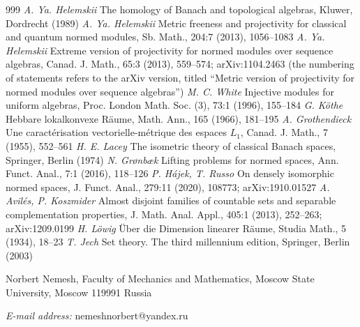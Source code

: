 \documentclass[12pt]{article}
\begin{document}
\begin{thebibliography}{999}
    \textit{A. Ya. Helemskii} The homology of Banach and topological algebras,
    Kluwer, Dordrecht (1989)
    \textit{A. Ya. Helemskii} Metric freeness and projectivity for classical
    and quantum normed modules, Sb. Math., 204:7 (2013), 1056--1083
    \textit{A. Ya. Helemskii} Extreme version of projectivity for normed
    modules over sequence algebras, Canad. J. Math., 65:3 (2013), 559--574;
    arXiv:1104.2463 (the numbering of statements refers to the arXiv
    version, titled ``Metric version of projectivity for normed modules over
    sequence algebras'')
    \textit{M. C. White} Injective modules for uniform algebras, Proc. London
    Math. Soc. (3), 73:1 (1996), 155--184
    \textit{G. K\"othe} Hebbare lokalkonvexe R\"aume, Math. Ann., 165 (1966),
    181--195
    \textit{A. Grothendieck} Une caract\'erisation vectorielle-m\'etrique des
    espaces $L_1$, Canad. J. Math., 7 (1955), 552--561
    \textit{H. E. Lacey} The isometric theory of classical Banach spaces,
    Springer, Berlin (1974)
    \textit{N. Gr{\o}nb{\ae}k} Lifting problems for normed spaces, Ann. Funct.
    Anal., 7:1 (2016), 118--126
    \textit{P. H\'ajek, T. Russo} On densely isomorphic normed spaces,
    J. Funct. Anal., 279:11 (2020), 108773; arXiv:1910.01527
    \textit{A. Avil\'es, P. Koszmider} Almost disjoint families of countable
    sets and separable complementation properties, J. Math. Anal. Appl.,
    405:1 (2013), 252--263; arXiv:1209.0199
    \textit{H. L\"owig} \"Uber die Dimension linearer R\"aume, Studia Math.,
    5 (1934), 18--23
    \textit{T. Jech} Set theory. The third millennium edition, Springer,
    Berlin (2003)
\end{thebibliography}

Norbert Nemesh, Faculty of Mechanics and Mathematics, Moscow State University,
Moscow 119991 Russia

\textit{E-mail address:} nemeshnorbert@yandex.ru
\end{document}
